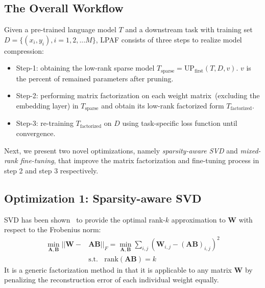 \subsection{The Overall Workflow}
\label{sec:ptf}
Given a pre-trained language model $T$ and a downstream task with training set $D=\{(x_i, y_i), i=1,2,...M\}$, LPAF consists of three steps to realize model compression: 
\begin{itemize}
	\item Step-1: obtaining the low-rank sparse model $T_{\text{sparse}}=\text{UP}_\text{first}(T,D, v)$. $v$ is the percent of remained parameters after pruning.
	\item Step-2:  performing matrix factorization on each weight matrix~(excluding the embedding layer) in $T_{\text{sparse}}$ and  obtain its low-rank factorized form $T_{\text{factorized}}$. 
	\item Step-3:  re-training $T_{\text{factorized}}$ on $D$ using task-specific loss function until convergence. 

\end{itemize}

Next, we present two novel optimizations, namely \textit{sparsity-aware SVD} and \textit{mixed-rank fine-tuning}, that improve the matrix factorization and fine-tuning process in step 2 and step 3 respectively.

\subsection{Optimization 1: Sparsity-aware SVD}
\label{sec:sasvd}
SVD has been shown~\cite{bestsvd} to provide the optimal rank-$k$ approximation to $\bm{W}$ with respect to the Frobenius norm:
\begin{align}
	\nonumber
	\min_{\bm{A},\bm{B}} ||\bm{W}-&\bm{A}\bm{B}||_{F}=\min_{\bm{A},\bm{B}} \sum_{i,j}(\bm{W}_{i,j}-(\bm{AB})_{i,j})^2 \\
	& \text{s.t.}~~~~\text{rank}(\bm{AB})=k
\end{align}
It is a generic factorization method in that it is applicable to any matrix $\bm{W}$ by penalizing the reconstruction error of each individual weight equally. 

